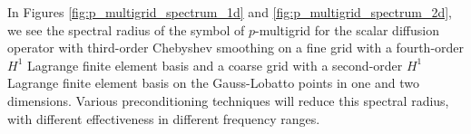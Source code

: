 In Figures \ref{fig:p_multigrid_spectrum_1d} and \ref{fig:p_multigrid_spectrum_2d}, we see the spectral radius of the symbol of $p$-multigrid for the scalar diffusion operator with third-order Chebyshev smoothing on a fine grid with a fourth-order $H^1$ Lagrange finite element basis and a coarse grid with a second-order $H^1$ Lagrange finite element basis on the Gauss-Lobatto points in one and two dimensions.
Various preconditioning techniques will reduce this spectral radius, with different effectiveness in different frequency ranges.

